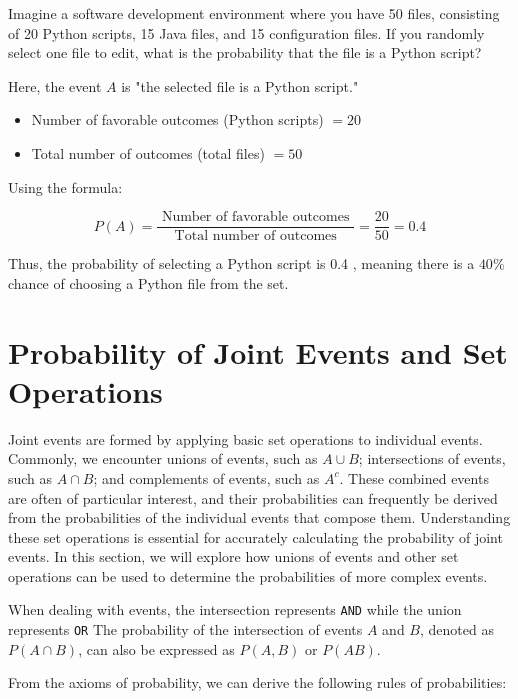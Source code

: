 \begin{example}
    Imagine a software development environment where you have 50 files, consisting of 20 Python scripts, 15 Java files, and 15 configuration files. If you randomly select one file to edit, what is the probability that the file is a Python script?
\end{example}

\begin{solution}
Here, the event $A$ is "the selected file is a Python script."
\begin{itemize}
    \item Number of favorable outcomes (Python scripts) $=20$
    \item Total number of outcomes (total files) $=50$
\end{itemize}

Using the formula:

$$
P(A)=\frac{\text { Number of favorable outcomes }}{\text { Total number of outcomes }}=\frac{20}{50}=0.4
$$

Thus, the probability of selecting a Python script is 0.4 , meaning there is a $40 \%$ chance of choosing a Python file from the set.

\end{solution}

\section{Probability of Joint Events and Set Operations}
Joint events are formed by applying basic set operations to individual events. Commonly, we encounter unions of events, such as $A \cup B$; intersections of events, such as $A \cap B$; and complements of events, such as $A^c$. These combined events are often of particular interest, and their probabilities can frequently be derived from the probabilities of the individual events that compose them. Understanding these set operations is essential for accurately calculating the probability of joint events. In this section, we will explore how unions of events and other set operations can be used to determine the probabilities of more complex events.

When dealing with events, the intersection represents \texttt{AND} while the union represents \texttt{OR} The probability of the intersection of events $A$ and $B$, denoted as $P(A \cap B)$, can also be expressed as $P(A, B)$ or $P(A B)$.

From the axioms of probability, we can derive the following rules of probabilities:

